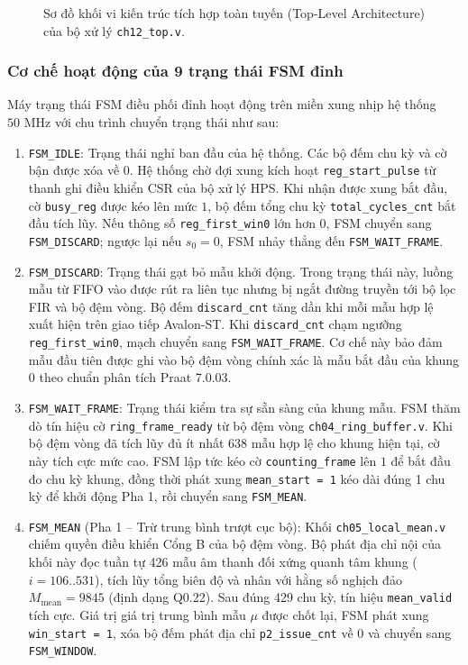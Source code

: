 \begin{figure}[htbp]
\centering

\caption{Sơ đồ khối vi kiến trúc tích hợp toàn tuyến (Top-Level Architecture) của bộ xử lý \texttt{ch12\_top.v}.}
\label{fig:ch12_top_arch}
\end{figure}

\subsubsection*{Cơ chế hoạt động của 9 trạng thái FSM đỉnh}
Máy trạng thái FSM điều phối đỉnh hoạt động trên miền xung nhịp hệ thống $50\text{ MHz}$ với chu trình chuyển trạng thái như sau:

\begin{enumerate}
    \item \texttt{FSM\_IDLE}: Trạng thái nghỉ ban đầu của hệ thống. Các bộ đếm chu kỳ và cờ bận được xóa về $0$. Hệ thống chờ đợi xung kích hoạt \texttt{reg\_start\_pulse} từ thanh ghi điều khiển CSR của bộ xử lý HPS. Khi nhận được xung bắt đầu, cờ \texttt{busy\_reg} được kéo lên mức $1$, bộ đếm tổng chu kỳ \texttt{total\_cycles\_cnt} bắt đầu tích lũy. Nếu thông số \texttt{reg\_first\_win0} lớn hơn $0$, FSM chuyển sang \texttt{FSM\_DISCARD}; ngược lại nếu $s_0 = 0$, FSM nhảy thẳng đến \texttt{FSM\_WAIT\_FRAME}.
    
    \item \texttt{FSM\_DISCARD}: Trạng thái gạt bỏ mẫu khởi động. Trong trạng thái này, luồng mẫu từ FIFO vào được rút ra liên tục nhưng bị ngắt đường truyền tới bộ lọc FIR và bộ đệm vòng. Bộ đếm \texttt{discard\_cnt} tăng dần khi mỗi mẫu hợp lệ xuất hiện trên giao tiếp Avalon-ST. Khi \texttt{discard\_cnt} chạm ngưỡng \texttt{reg\_first\_win0}, mạch chuyển sang \texttt{FSM\_WAIT\_FRAME}. Cơ chế này bảo đảm mẫu đầu tiên được ghi vào bộ đệm vòng chính xác là mẫu bắt đầu của khung 0 theo chuẩn phân tích Praat 7.0.03.

    \item \texttt{FSM\_WAIT\_FRAME}: Trạng thái kiểm tra sự sẵn sàng của khung mẫu. FSM thăm dò tín hiệu cờ \texttt{ring\_frame\_ready} từ bộ đệm vòng \texttt{ch04\_ring\_buffer.v}. Khi bộ đệm vòng đã tích lũy đủ ít nhất 638 mẫu hợp lệ cho khung hiện tại, cờ này tích cực mức cao. FSM lập tức kéo cờ \texttt{counting\_frame} lên $1$ để bắt đầu đo chu kỳ khung, đồng thời phát xung \texttt{mean\_start = 1} kéo dài đúng 1 chu kỳ để khởi động Pha 1, rồi chuyển sang \texttt{FSM\_MEAN}.

    \item \texttt{FSM\_MEAN} (Pha 1 -- Trừ trung bình trượt cục bộ): Khối \texttt{ch05\_local\_mean.v} chiếm quyền điều khiển Cổng B của bộ đệm vòng. Bộ phát địa chỉ nội của khối này đọc tuần tự 426 mẫu âm thanh đối xứng quanh tâm khung ($i = 106..531$), tích lũy tổng biên độ và nhân với hằng số nghịch đảo $M_{\text{mean}} = 9845$ (định dạng Q0.22). Sau đúng 429 chu kỳ, tín hiệu \texttt{mean\_valid} tích cực. Giá trị giá trị trung bình mẫu $\mu$ được chốt lại, FSM phát xung \texttt{win\_start = 1}, xóa bộ đếm phát địa chỉ \texttt{p2\_issue\_cnt} về 0 và chuyển sang \texttt{FSM\_WINDOW}.


\end{enumerate}
